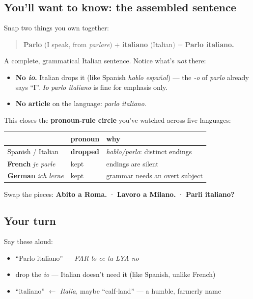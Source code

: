 \subsection*{You'll want to know: the assembled sentence}
Snap two things you own together:

\begin{quote}
\textbf{Parlo} (I speak, from \emph{parlare}) + \textbf{italiano} (Italian) = \textbf{Parlo italiano.}
\end{quote}

A complete, grammatical Italian sentence. Notice what's \emph{not} there:

\begin{itemize}
\raggedright
  \item \textbf{No \emph{io}.} Italian drops it (like Spanish \emph{hablo español}) — the \emph{-o} of \emph{parlo} already says \textquotedblleft{}I\textquotedblright{}. \emph{Io parlo italiano} is fine for emphasis only.
  \item \textbf{No article} on the language: \emph{parlo italiano}.
\end{itemize}

This closes the \textbf{pronoun-rule circle} you've watched across five languages:

\noindent
\begin{tabularx}{\linewidth}{@{}>{\raggedright\arraybackslash}X>{\raggedright\arraybackslash}X>{\raggedright\arraybackslash}X@{}}
\toprule
\textbf{} & \textbf{pronoun} & \textbf{why} \\
\midrule
Spanish / Italian & \textbf{dropped} & \emph{hablo/parlo}: distinct endings \\
\textbf{French} \emph{je parle} & kept & endings are silent \\
\textbf{German} \emph{ich lerne} & kept & grammar needs an overt subject \\
\bottomrule
\end{tabularx}

Swap the pieces: \textbf{Abito a Roma.} · \textbf{Lavoro a Milano.} · \textbf{Parli italiano?}

\subsection*{Your turn}
Say these aloud:

\begin{itemize}
\raggedright
  \item \textquotedblleft{}Parlo italiano\textquotedblright{} — \emph{PAR-lo ee-ta-LYA-no}
  \item drop the \emph{io} — Italian doesn't need it (like Spanish, unlike French)
  \item \textquotedblleft{}italiano\textquotedblright{} $\leftarrow$ \emph{Italia}, maybe \textquotedblleft{}calf-land\textquotedblright{} — a humble, farmerly name
\end{itemize}

